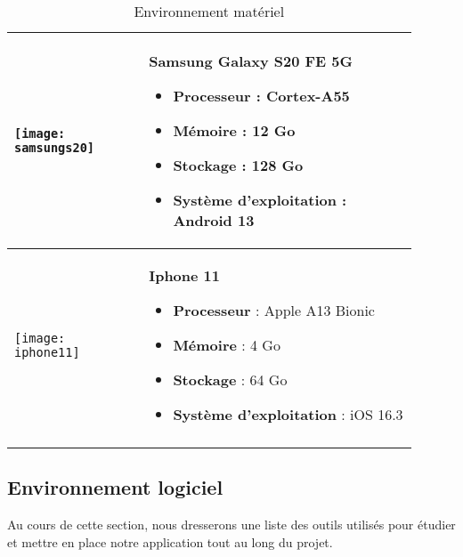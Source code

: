 \begin{longtable}{|p{0.3\linewidth}|p{0.6\linewidth}|}
      \hline
      \begin{minipage}{\linewidth}
       \texttt{[image: samsungs20]}
      \end{minipage} &
      \begin{minipage}{\linewidth}
        \vspace{0.2cm}
        \textbf{Samsung Galaxy S20 FE 5G}
        \begin{itemize}
          \item \textbf{Processeur} : Cortex-A55 
          \item \textbf{Mémoire} : 12 Go 
          \item \textbf{Stockage} : 128 Go
          \item \textbf{Système d'exploitation} : Android 13
        \end{itemize}
        \vspace{0.2cm}
      \end{minipage} \\

      \hline
      \begin{minipage}{\linewidth}
       \texttt{[image: iphone11]}
      \end{minipage} &
      \begin{minipage}{\linewidth}
        \vspace{0.2cm}
        \textbf{Iphone 11}
        \begin{itemize}
          \item \textbf{Processeur} : Apple A13 Bionic
          \item \textbf{Mémoire} : 4 Go
          \item \textbf{Stockage} : 64 Go
          \item \textbf{Système d'exploitation} : iOS 16.3
        \end{itemize}
        \vspace{0.2cm}
      \end{minipage} \\

      \hline
      
      


  \caption{Environnement matériel}
  \label{tab:environnement_materiel}
\end{longtable}

\subsection{Environnement logiciel}
Au cours de cette section, nous dresserons une liste des outils utilisés pour étudier et mettre en place notre application tout au long du projet.

